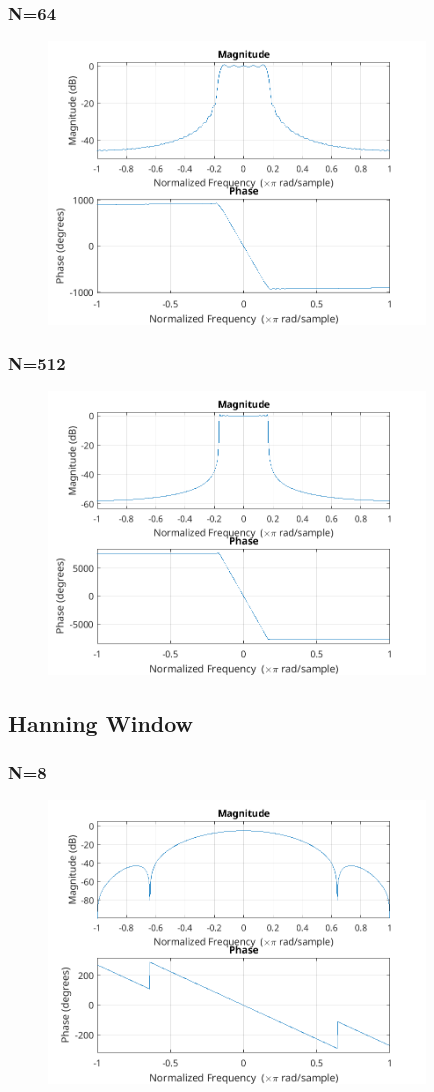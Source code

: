 \documentclass{article}
\begin{document}
  \subsubsection{N=64}
  \begin{figure}[!htb]
  \includegraphics[width=10cm]{freqz_tri_64.png}
  \end{figure}
  \subsubsection{N=512}
  \begin{figure}[!htb]
  \includegraphics[width=10cm]{freqz_tri_512.png}
  \end{figure} 
\subsection{Hanning Window}
  \subsubsection{N=8}
  \begin{figure}[!htb]
  \includegraphics[width=10cm]{freqz_han_8.png}
  \end{figure}
\end{document}
